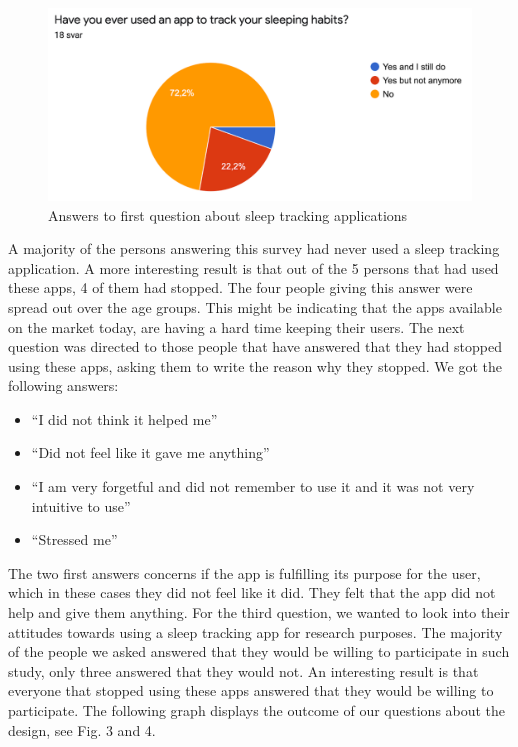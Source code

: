 \documentclass{article}
\begin{document}
\begin{figure}[!h]
  \begin{center}
    \includegraphics[scale=0.8]{Diagram1.png}
    \caption{Answers to first question about sleep tracking applications
}
    \label{fig:diagram1}
  \end{center}
\end{figure}

A majority of the persons answering this survey had never used a sleep tracking application. A more interesting result is that out of the 5 persons that had used these apps, 4 of them had stopped. The four people giving this answer were spread out over the age groups. This might be indicating that the apps available on the market today, are having a hard time keeping their users. The next question was directed to those people that have answered that they had stopped using these apps, asking them to write the reason why they stopped. We got the following answers:

\begin{itemize}
    \item “I did not think it helped me”
    \item “Did not feel like it gave me anything”
    \item “I am very forgetful and did not remember to use it and it was not very intuitive to use”
    \item “Stressed me”
\end{itemize}

The two first answers concerns if the app is fulfilling its purpose for the user, which in these cases they did not feel like it did. They felt that the app did not help and give them anything. For the third question, we wanted to look into their attitudes towards using a sleep tracking app for research purposes. The majority of the people we asked answered that they would be willing to participate in such study, only three answered that they would not. An interesting result is that everyone that stopped using these apps answered that they would be willing to participate. The following graph displays the outcome of our questions about the design, see Fig. 3 and 4. 
\end{document}
